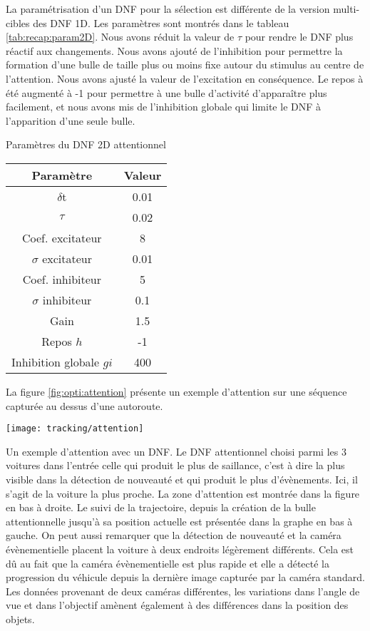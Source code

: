 	La paramétrisation d'un DNF pour la sélection est différente de la version multi-cibles des DNF 1D. Les paramètres sont montrés dans le tableau \ref{tab:recap:param2D}. Nous avons réduit la valeur de $\tau$ pour rendre le DNF plus réactif aux changements. Nous avons ajouté de l'inhibition pour permettre la formation d'une bulle de taille plus ou moins fixe autour du stimulus au centre de l'attention. Nous avons ajusté la valeur de l'excitation en conséquence. Le repos à été augmenté à -1 pour permettre à une bulle d'activité d'apparaître plus facilement, et nous avons mis de l'inhibition globale qui limite le DNF à l'apparition d'une seule bulle.

	\begin{tableth}
	\caption{Paramètres du DNF 2D attentionnel}
	\begin{tabular}{|c|c|}
		\hline
		Paramètre & Valeur\\
		\hline
		$\delta$t & 0.01 \\
		$\tau$ & 0.02 \\
		Coef. excitateur & 8 \\
		$\sigma$ excitateur & 0.01 \\
		Coef. inhibiteur & 5 \\
		$\sigma$ inhibiteur & 0.1 \\
		Gain & 1.5 \\
		Repos $h$ & -1 \\
		Inhibition globale $gi$ & 400 \\
		\hline
	\end{tabular}
	\label{tab:recap:param2D}
	\end{tableth}

	La figure \ref{fig:opti:attention} présente un exemple d'attention sur une séquence capturée au dessus d'une autoroute.

	\begin{figureth}
		\begin{subfigureth}{\textwidth}
			\texttt{[image: tracking/attention]}
		\end{subfigureth}
		\caption[Exemple d'Attention avec DNF]{Un exemple d'attention avec un DNF. Le DNF attentionnel choisi parmi les 3 voitures dans l'entrée celle qui produit le plus de saillance, c'est à dire la plus visible dans la détection de nouveauté et qui produit le plus d'évènements. Ici, il s'agit de la voiture la plus proche. La zone d'attention est montrée dans la figure en bas à droite. Le suivi de la trajectoire, depuis la création de la bulle attentionnelle jusqu'à sa position actuelle est présentée dans la graphe en bas à gauche. On peut aussi remarquer que la détection de nouveauté et la caméra évènementielle placent la voiture à deux endroits légèrement différents. Cela est dû au fait que la caméra évènementielle est plus rapide et elle a détecté la progression du véhicule depuis la dernière image capturée par la caméra standard. Les données provenant de deux caméras différentes, les variations dans l'angle de vue et dans l'objectif amènent également à des différences dans la position des objets.}\label{fig:opti:attention}
	\end{figureth}

